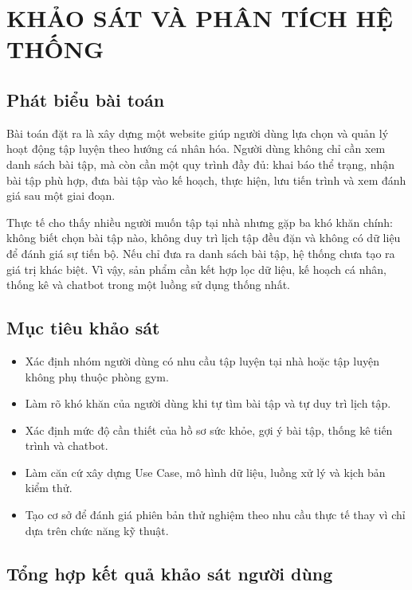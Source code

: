 \chapter{KHẢO SÁT VÀ PHÂN TÍCH HỆ THỐNG}

\section{Phát biểu bài toán}

Bài toán đặt ra là xây dựng một website giúp người dùng lựa chọn và quản lý hoạt động tập luyện theo hướng cá nhân hóa. Người dùng không chỉ cần xem danh sách bài tập, mà còn cần một quy trình đầy đủ: khai báo thể trạng, nhận bài tập phù hợp, đưa bài tập vào kế hoạch, thực hiện, lưu tiến trình và xem đánh giá sau một giai đoạn.


Thực tế cho thấy nhiều người muốn tập tại nhà nhưng gặp ba khó khăn chính: không biết chọn bài tập nào, không duy trì lịch tập đều đặn và không có dữ liệu để đánh giá sự tiến bộ. Nếu chỉ đưa ra danh sách bài tập, hệ thống chưa tạo ra giá trị khác biệt. Vì vậy, sản phẩm cần kết hợp lọc dữ liệu, kế hoạch cá nhân, thống kê và chatbot trong một luồng sử dụng thống nhất.


\section{Mục tiêu khảo sát}

\begin{itemize}

    \item Xác định nhóm người dùng có nhu cầu tập luyện tại nhà hoặc tập luyện không phụ thuộc phòng gym.

    \item Làm rõ khó khăn của người dùng khi tự tìm bài tập và tự duy trì lịch tập.

    \item Xác định mức độ cần thiết của hồ sơ sức khỏe, gợi ý bài tập, thống kê tiến trình và chatbot.

    \item Làm căn cứ xây dựng Use Case, mô hình dữ liệu, luồng xử lý và kịch bản kiểm thử.

    \item Tạo cơ sở để đánh giá phiên bản thử nghiệm theo nhu cầu thực tế thay vì chỉ dựa trên chức năng kỹ thuật.

\end{itemize}

\section{Tổng hợp kết quả khảo sát người dùng}

